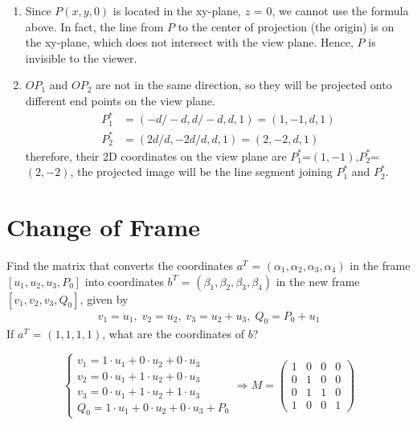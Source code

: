 \documentclass[11pt]{article}  %
\begin{document}
    \begin{enumerate}
        \item Since $P(x,y,0)$ is located in the xy-plane, $z$ = 0, we cannot use the formula above. In fact, the line from $P$ to the center of projection (the origin) is on the xy-plane, which does not intersect with the view plane. Hence, $P$ is invisible to the viewer.
        \item $OP_1$ and $OP_2$ are not in the same direction, so they will be projected onto different end points on the view plane.
        \begin{align*}
            P_1^* &= (-d/-d,d/-d,d,1) = (1,-1,d,1)\\
            P_2^* &= (2d/d,-2d/d,d,1) = (2,-2,d,1)
        \end{align*}
        therefore, their 2D coordinates on the view plane are $P_1^*$=$(1,-1)$,$P_2^*$=$(2,-2)$, the projected image will be the line segment joining $P_1^*$ and $P_2^*$.
    \end{enumerate}

\section{Change of Frame}
    Find the matrix that converts the coordinates $a^T$ = $(\alpha_1,\alpha_2,\alpha_3,\alpha_4)$ in the frame $[u_1,u_2,u_3,P_0]$ into coordinates $b^T$ = $(\beta_1,\beta_2,\beta_3,\beta_4)$ in the new frame $[v_1,v_2,v_3,Q_0]$, given by
    \begin{align*}
        v_1 = u_1,\; v_2 = u_2,\; v_3 = u_2 + u_3,\; Q_0 = P_0 + u_1
    \end{align*}
    If $a^T$ = $(1,1,1,1)$, what are the coordinates of $b$?\vspace{3mm}
    
    \solution
    \begin{equation*}
        \begin{cases}
            v_1 = 1 \cdot u_1 + 0 \cdot u_2 + 0 \cdot u_3\\
            v_2 = 0 \cdot u_1 + 1 \cdot u_2 + 0 \cdot u_3\\
            v_3 = 0 \cdot u_1 + 1 \cdot u_2 + 1 \cdot u_3\\
            Q_0 = 1 \cdot u_1 + 0 \cdot u_2 + 0 \cdot u_3 + P_0
        \end{cases}
        \Rightarrow M=
        \begin{pmatrix}
             1 & 0 & 0 & 0\\
             0 & 1 & 0 & 0\\
             0 & 1 & 1 & 0\\
             1 & 0 & 0 & 1
        \end{pmatrix}
    \end{equation*}
\end{document}
